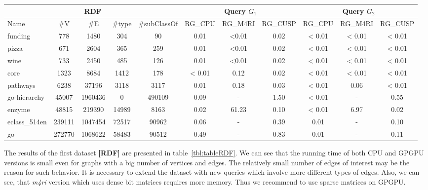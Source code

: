 {\setlength{\tabcolsep}{0.4em}
\begin{table*}[h]
\caption{RDFs querying results}
\label{tbl:tableRDF}
\begin{tabular}{| p{1.5cm} | c | c |c | c | c | c | c | c | c | c |}
    \hline
    \multicolumn{5}{|c|}{RDF}        & \multicolumn{3}{|c|}{Query $G_1$}                               & \multicolumn{3}{|c|}{Query $G_2$} \\
    \hline
    Name                  & \#V    & \#E     & \#type &\#subClassOf & RG\_CPU & RG\_M4RI  & RG\_CUSP   & RG\_CPU & RG\_M4RI  & RG\_CUSP \\
    \hline
    \hline
    \small{funding}       & 778    & 1480    & 304   & 90           & 0.01      & <0.01   & 0.02       & < 0.01  & < 0.01    & < 0.01    \\
    \small{pizza}         & 671    & 2604    & 365   & 259          & 0.01      & <0.01   & 0.02       & < 0.01  & < 0.01    & < 0.01    \\
    \small{wine}          & 733    & 2450    & 485   & 126          & 0.01      & <0.01   & 0.02       & < 0.01  & < 0.01    & < 0.01    \\
    \small{core}          & 1323   & 8684    & 1412  & 178          & < 0.01    & 0.12    & 0.02       & < 0.01  & < 0.01    & < 0.01    \\
    \small{pathways}      & 6238   & 37196   & 3118  & 3117         & 0.01      & 0.18    & 0.03       & < 0.01  & 0.06      & < 0.01    \\
    \small{go-hierarchy}  & 45007  & 1960436 & 0     & 490109       & 0.09      & -       & 1.50       & < 0.01  & -         & 0.55      \\
    \small{enzyme}        & 48815  & 219390  & 14989 & 8163         & 0.02      & 61.23   & 0.10       & < 0.01  & 6.97      & 0.02      \\
    \small{eclass\_514en} & 239111 & 1047454 & 72517 & 90962        & 0.06      & -       & 0.39       & 0.01    & -         & 0.10      \\
    \small{go}            & 272770 & 1068622 & 58483 & 90512        & 0.49      & -       & 0.83       & 0.01    & -         & 0.11      \\
    \hline
  \end{tabular}
\end{table*}
}


The results of the first dataset \textbf{[RDF]} are presented in table~\ref{tbl:tableRDF}.
We can see that the running time of both CPU and GPGPU versions is small even for graphs with a big number of vertices and edges.
The relatively small number of edges of interest may be the reason for such behavior.
It is necessary to extend the dataset with new queries which involve more different types of edges.
Also, we can see, that \textit{m4ri} version which uses dense bit matrices requires more memory.
Thus we recommend to use sparse matrices on GPGPU.

